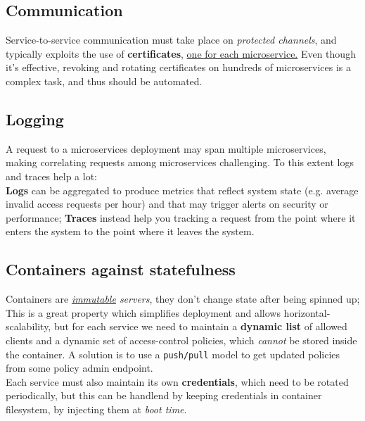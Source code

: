 \subsection{Communication}
Service-to-service communication must take place on \textit{protected channels}, and typically exploits the use of \textbf{certificates}, \underline{one for each microservice.}
Even though it's effective,
revoking and rotating certificates on hundreds of microservices is a complex task, and thus should be automated.

\subsection{Logging}
A request to a microservices deployment may span multiple microservices, making correlating requests among microservices challenging.
To this extent logs and traces help a lot:\\
\textbf{Logs} can be aggregated to produce metrics that reflect system state (e.g.
average invalid access requests per hour) and that may trigger alerts on security or performance;
\textbf{Traces} instead help you tracking a request from the point where it enters the system to the point where it leaves the system.

\subsection{Containers against statefulness}
Containers are \textit{\underline{immutable} servers}, they don’t change state after being spinned up;
This is a great property which simplifies deployment and allows horizontal-scalability,
but for each service we need to maintain a \textbf{dynamic list} of allowed clients and a dynamic set of access-control policies, which \textit{cannot} be stored inside the container.
A solution is to use a \texttt{push/pull} model to get updated policies from some policy admin endpoint.\\
Each service must also maintain its own \textbf{credentials}, which need to be rotated periodically,
but this can be handlend by keeping credentials in container filesystem, by injecting them at \textit{boot time}.

